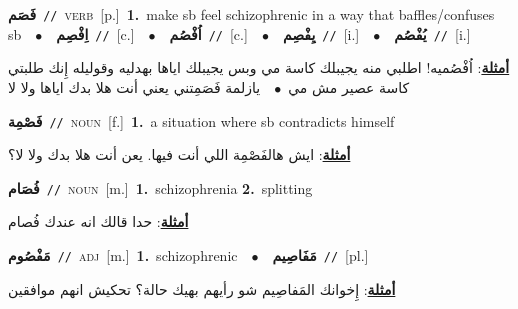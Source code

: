 \documentclass[10pt,a4paper,twoside]{article} %
\begin{document}
\begin{multicols}{2}
{\setlength\topsep{0pt}\textbf{\foreignlanguage{arabic}{فَصَم}}\ {\color{gray}\texttt{//}\color{black}}\ \textsc{verb}\ [p.]\ \textbf{1.}~make sb feel schizophrenic in a way that baffles/confuses sb\ \ $\bullet$\ \ \setlength\topsep{0pt}\textbf{\foreignlanguage{arabic}{اِفْصِم}}\ {\color{gray}\texttt{//}\color{black}}\ [c.]\ \ $\bullet$\ \ \setlength\topsep{0pt}\textbf{\foreignlanguage{arabic}{اُفْصُم}}\ {\color{gray}\texttt{//}\color{black}}\ [c.]\ \ $\bullet$\ \ \setlength\topsep{0pt}\textbf{\foreignlanguage{arabic}{يِفْصِم}}\ {\color{gray}\texttt{//}\color{black}}\ [i.]\ \ $\bullet$\ \ \setlength\topsep{0pt}\textbf{\foreignlanguage{arabic}{يُفْصُم}}\ {\color{gray}\texttt{//}\color{black}}\ [i.]\  \begin{flushright}\color{gray}\foreignlanguage{arabic}{\textbf{\underline{\foreignlanguage{arabic}{أمثلة}}}: اُفْصُميه! اطلبي منه يجيبلك كاسة مي وبس يجيبلك اياها بهدليه وقوليله إِنك طلبتي كاسة عصير مش مي\ $\bullet$\ \  يازلمة فَصَمِتني يعني أنت هلا بدك اياها ولا لا}\end{flushright}\color{black}} \vspace{2mm}

{\setlength\topsep{0pt}\textbf{\foreignlanguage{arabic}{فَصْمِة}}\ {\color{gray}\texttt{//}\color{black}}\ \textsc{noun}\ [f.]\ \textbf{1.}~a situation where sb contradicts himself\  \begin{flushright}\color{gray}\foreignlanguage{arabic}{\textbf{\underline{\foreignlanguage{arabic}{أمثلة}}}: ايش هالفَصْمِة اللي أنت فيها. يعن أنت هلا بدك ولا لا؟}\end{flushright}\color{black}} \vspace{2mm}

{\setlength\topsep{0pt}\textbf{\foreignlanguage{arabic}{فُصَام}}\ {\color{gray}\texttt{//}\color{black}}\ \textsc{noun}\ [m.]\ \textbf{1.}~schizophrenia  \textbf{2.}~splitting\  \begin{flushright}\color{gray}\foreignlanguage{arabic}{\textbf{\underline{\foreignlanguage{arabic}{أمثلة}}}: حدا قالك انه عندك فُصام}\end{flushright}\color{black}} \vspace{2mm}

{\setlength\topsep{0pt}\textbf{\foreignlanguage{arabic}{مَفْصُوم}}\ {\color{gray}\texttt{//}\color{black}}\ \textsc{adj}\ [m.]\ \textbf{1.}~schizophrenic\ \ $\bullet$\ \ \setlength\topsep{0pt}\textbf{\foreignlanguage{arabic}{مَفَاصِيم}}\ {\color{gray}\texttt{//}\color{black}}\ [pl.]\  \begin{flushright}\color{gray}\foreignlanguage{arabic}{\textbf{\underline{\foreignlanguage{arabic}{أمثلة}}}: إِخوانك المَفاصِيم شو رأيهم بهيك حالة؟ تحكيش انهم موافقين}\end{flushright}\color{black}} \vspace{2mm}


\end{multicols}
\end{document}
